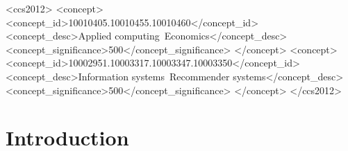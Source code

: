 \documentclass[manuscript, nonacm]{acmart}
\title[Deconstructing the Filter Bubble]{\PaperTitle}
\begin{document}
\begin{CCSXML}
<ccs2012>
<concept>
<concept_id>10010405.10010455.10010460</concept_id>
<concept_desc>Applied computing~Economics</concept_desc>
<concept_significance>500</concept_significance>
</concept>
<concept>
<concept_id>10002951.10003317.10003347.10003350</concept_id>
<concept_desc>Information systems~Recommender systems</concept_desc>
<concept_significance>500</concept_significance>
</concept>
</ccs2012>
\end{CCSXML}




\begin{abstract}
We study a model of user decision-making in the context of recommender systems via numerical simulation.
Our model provides an explanation for the findings of Nguyen, et. al (2014), where, in environments where recommender systems are typically deployed, users consume increasingly similar items over time even without recommendation. We find that recommendation alleviates these natural filter-bubble effects, but that it also leads to an increase in homogeneity across users, resulting in a trade-off between homogenizing across-user consumption and diversifying within-user consumption. Finally, we discuss how our model highlights the importance of collecting data on user beliefs and their evolution over time both to design better recommendations and to further understand their impact.
\end{abstract}

\author{Guy Aridor}


\author{Duarte Gon\c{c}alves}

\author{Shan Sikdar}


\maketitle


\section{Introduction}
\end{document}
